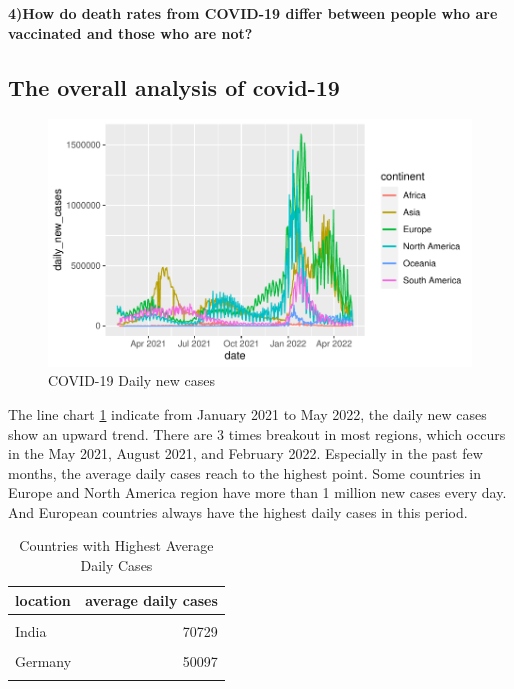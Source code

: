 \documentclass[11pt,a4paper,]{article}
\begin{document}
\textbf{4)How do death rates from COVID-19 differ between people who are vaccinated and those who are not?}

\hypertarget{the-overall-analysis-of-covid-19}{%
\subsection{\texorpdfstring{\textbf{The overall analysis of covid-19}}{The overall analysis of covid-19}}\label{the-overall-analysis-of-covid-19}}

\begin{figure}

{\centering \includegraphics{report_files/figure-latex/Figure1-1} 

}

\caption{COVID-19 Daily new cases}\label{fig:Figure1}
\end{figure}

The line chart \ref{fig:Figure1} indicate from January 2021 to May 2022, the daily new cases show an upward trend. There are 3 times breakout in most regions, which occurs in the May 2021, August 2021, and February 2022. Especially in the past few months, the average daily cases reach to the highest point. Some countries in Europe and North America region have more than 1 million new cases every day. And European countries always have the highest daily cases in this period.

\begin{table}[!h]

\caption{\label{tab:Table1}Countries with Highest Average Daily Cases}
\centering
\begin{tabular}[t]{l|r}
\hline
location & average daily cases\\
\hline
\cellcolor{gray!6}{United States} & \cellcolor{gray!6}{120485}\\
\hline
India & 70729\\
\hline
\cellcolor{gray!6}{France} & \cellcolor{gray!6}{56649}\\
\hline
Germany & 50097\\
\hline
\cellcolor{gray!6}{Brazil} & \cellcolor{gray!6}{46861}\\
\hline
\end{tabular}
\end{table}
\end{document}
